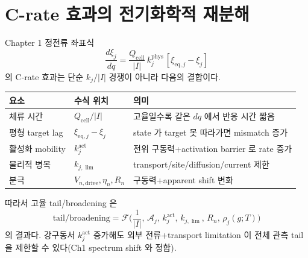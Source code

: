 \documentclass[11pt,a4paper]{article}
\newcommand{\eq}{\mathrm{eq}}
\newcommand{\drive}{\mathrm{drive}}
\newcommand{\cell}{\mathrm{cell}}
\begin{document}
\section{C-rate 효과의 전기화학적 재분해}\label{sec:ch3_crate}
Chapter 1 정전류 좌표식
\begin{equation}
\frac{d\xi_j}{dq}=\frac{Q_\cell}{|I|}\,k_j^{\mathrm{phys}}\,[\xi_{\eq,j}-\xi_j]
\label{eq:ch3_crate}
\end{equation}
의 C-rate 효과는 단순 $k_j/|I|$ 경쟁이 아니라 다음의 결합이다.
\begin{longtable}{p{} p{} p{}}
\toprule 요소 & 수식 위치 & 의미 \\ \midrule \endhead
체류 시간 & $Q_\cell/|I|$ & 고율일수록 같은 $dq$ 에서 반응 시간 짧음 \\
평형 target lag & $\xi_{\eq,j}-\xi_j$ & state 가 target 못 따라가면 mismatch 증가 \\
활성화 mobility & $k_j^{\mathrm{act}}$ & 전위 구동력+activation barrier 로 rate 증가 \\
물리적 병목 & $k_{j,\lim}$ & transport/site/diffusion/current 제한 \\
분극 & $V_{n,\drive},\eta_n,R_n$ & 구동력+apparent shift 변화 \\
\bottomrule
\end{longtable}
따라서 고율 tail/broadening 은
\begin{equation}
\mathrm{tail/broadening}=\mathcal F\!\Big(\frac{1}{|I|},\,\mathcal A_j,\,k_j^{\mathrm{act}},\,k_{j,\lim},\,R_n,\,\rho_j(g;T)\Big)
\label{eq:ch3_tail_function}
\end{equation}
의 결과다. 강구동서 $k_j^{\mathrm{act}}$ 증가해도 외부 전류+transport limitation 이 전체 관측 tail 을
제한할 수 있다(Ch1 spectrum shift 와 정합).

\end{document}

